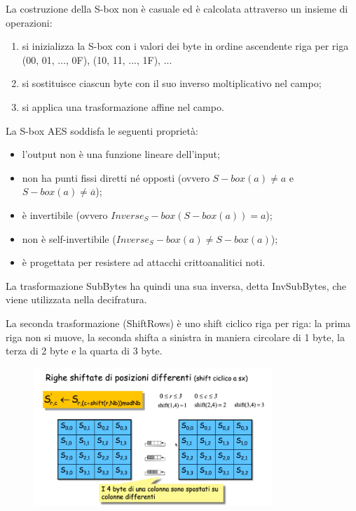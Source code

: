 La costruzione della S-box non è casuale ed è calcolata attraverso un insieme di operazioni:
\begin{enumerate}
    \item si inizializza la S-box con i valori dei byte in ordine ascendente riga per riga (00, 01, ..., 0F), (10, 11, ..., 1F), ...
    \item si sostituisce ciascun byte con il suo inverso moltiplicativo nel campo;
    \item si applica una trasformazione affine nel campo.
\end{enumerate}
La S-box AES soddisfa le seguenti proprietà:
\begin{itemize}
    \item l'output non è una funzione lineare dell'input;
    \item non ha punti fissi diretti né opposti (ovvero $S-box(a) \neq a$ e $S-box(a) \neq \overline{a}$);
    \item è invertibile (ovvero $Inverse_S-box(S-box(a)) = a$);
    \item non è self-invertibile ($Inverse_S-box(a) \neq S-box(a)$);
    \item è progettata per resistere ad attacchi crittoanalitici noti.
\end{itemize}

La trasformazione SubBytes ha quindi una sua inversa, detta InvSubBytes, che viene utilizzata nella decifratura. 

\vspace{5mm}

La seconda trasformazione (ShiftRows) è uno shift ciclico riga per riga: la prima riga non si muove, la seconda shifta a sinistra in maniera circolare di 1 byte, la terza di 2 byte e la quarta di 3 byte.

\begin{figure}[htb!]
    \centering
    \includegraphics[width=9cm]{./Images/cap1/1.26.png}
\end{figure} 

